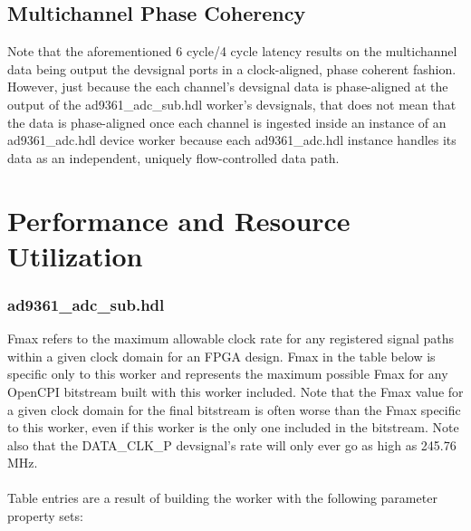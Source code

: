 \documentclass{article}
\def\comp{ad9361\_adc\_sub}
\begin{document}
\subsection*{Multichannel Phase Coherency}
Note that the aforementioned 6 cycle/4 cycle latency results on the multichannel data being output the devsignal ports in a clock-aligned, phase coherent fashion. However, just because the each channel's devsignal data is phase-aligned at the output of the \comp{}.hdl worker's devsignals, that does not mean that the data is phase-aligned once each channel is ingested inside an instance of an ad9361\_adc.hdl device worker because each ad9361\_adc.hdl instance handles its data as an independent, uniquely flow-controlled data path.

\section*{Performance and Resource Utilization}
\subsubsection*{\comp.hdl}
Fmax refers to the maximum allowable clock rate for any registered signal paths within a given clock domain for an FPGA design. Fmax in the table below is specific only to this worker and represents the maximum possible Fmax for any OpenCPI bitstream built with this worker included. Note that the Fmax value for a given clock domain for the final bitstream is often worse than the Fmax specific to this worker, even if this worker is the only one included in the bitstream. Note also that the DATA\_CLK\_P devsignal's rate will only ever go as high as 245.76 MHz\cite{adi_ug570}. \\ \\
Table entries are a result of building the worker with the following parameter property sets:
\end{document}
